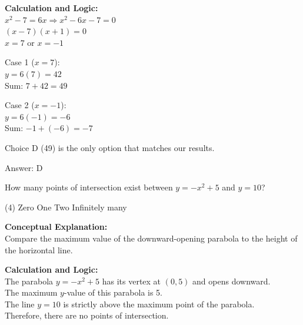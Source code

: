 \documentclass[11pt,paper=a4,answers]{exam}
\begin{document}
\begin{questions}
\begin{solution}
\textbf{Calculation and Logic:} \\
$x^2 - 7 = 6x \Rightarrow x^2 - 6x - 7 = 0$ \\
$(x - 7)(x + 1) = 0$ \\
$x = 7$ or $x = -1$

\vspace{10pt}

Case 1 ($x = 7$): \\
$y = 6(7) = 42$ \\
Sum: $7 + 42 = 49$

\vspace{10pt}

Case 2 ($x = -1$): \\
$y = 6(-1) = -6$ \\
Sum: $-1 + (-6) = -7$

\vspace{10pt}

Choice D (49) is the only option that matches our results.

\vspace{25pt}

Answer: \colorbox{yellow!100}{D}
\end{solution}

\vspace{40pt}

\question
How many points of intersection exist between $y = -x^2 + 5$ and $y = 10$?
\begin{tasks}(4)
    \task Zero
    \task One
    \task Two
    \task Infinitely many
\end{tasks}

\begin{solution}
\textbf{Conceptual Explanation:} \\
Compare the maximum value of the downward-opening parabola to the height of the horizontal line.

\vspace{20pt}

\textbf{Calculation and Logic:} \\
The parabola $y = -x^2 + 5$ has its vertex at $(0, 5)$ and opens downward. \\
The maximum $y$-value of this parabola is 5. \\
The line $y = 10$ is strictly above the maximum point of the parabola. \\
Therefore, there are no points of intersection.

\vspace{25pt}


\end{solution}
\end{questions}
\end{document}
